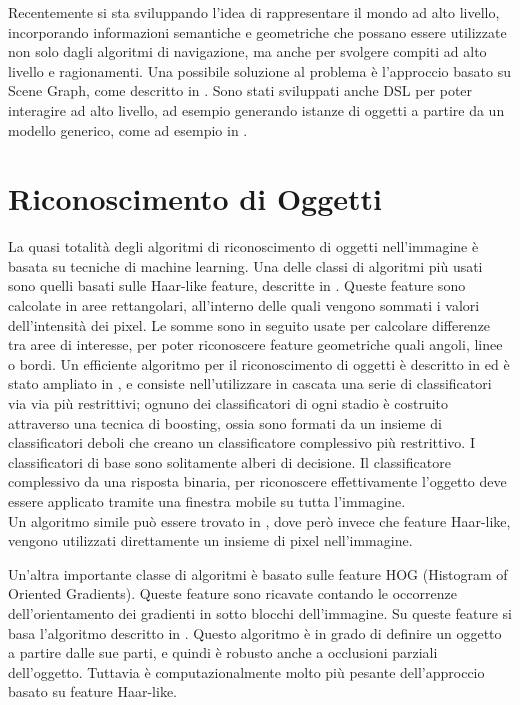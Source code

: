 Recentemente si sta sviluppando l'idea di rappresentare il mondo ad alto livello, incorporando informazioni semantiche e geometriche che possano essere utilizzate non solo dagli algoritmi di navigazione, ma anche per svolgere compiti ad alto livello e ragionamenti. Una possibile soluzione al problema è l'approccio basato su Scene Graph, come descritto in \cite{6630614}. Sono stati sviluppati anche DSL per poter interagire ad alto livello, ad esempio generando istanze di oggetti a partire da un modello generico, come ad esempio in \cite{blumenthal2014towards}.

\section{Riconoscimento di Oggetti}

La quasi totalità degli algoritmi di riconoscimento di oggetti nell'immagine è basata su tecniche di machine learning.
Una delle classi di algoritmi più usati sono quelli basati sulle Haar-like feature, descritte in \cite{710772}.
Queste feature sono calcolate in aree rettangolari, all'interno delle quali vengono sommati i valori dell'intensità dei pixel. Le somme sono in seguito usate per calcolare differenze tra aree di interesse, per poter riconoscere feature geometriche quali angoli, linee o bordi.
Un efficiente algoritmo per il riconoscimento di oggetti è descritto in \cite{Viola01rapidobject} ed è stato ampliato in \cite{Lienhart02anextended}, e consiste nell'utilizzare in cascata una serie di classificatori via via più restrittivi; ognuno dei classificatori di ogni stadio è costruito attraverso una tecnica di boosting, ossia sono formati da un insieme di classificatori deboli che creano un classificatore complessivo più restrittivo. I classificatori di base sono solitamente alberi di decisione. Il classificatore complessivo da una risposta binaria, per riconoscere effettivamente l'oggetto deve essere applicato tramite una finestra mobile su tutta l'immagine. \\
Un algoritmo simile può essere trovato in \cite{journals/ijista/AbramsonSG07}, dove però invece che feature Haar-like, vengono utilizzati direttamente un insieme di pixel nell'immagine.

Un'altra importante classe di algoritmi è basato sulle feature HOG (Histogram of Oriented Gradients). Queste feature sono ricavate contando le occorrenze dell'orientamento dei gradienti in sotto blocchi dell'immagine.
Su queste feature si basa l'algoritmo descritto in \cite{lsvm-pami}. Questo algoritmo è in grado di definire un oggetto a partire dalle sue parti, e quindi è robusto anche a occlusioni parziali dell'oggetto. Tuttavia è computazionalmente molto più pesante dell'approccio basato su feature Haar-like.

